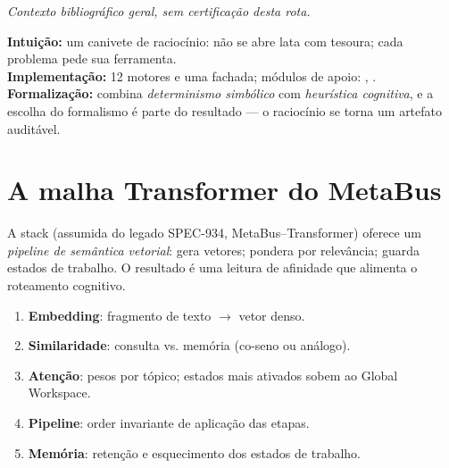 \noindent\textit{Contexto bibliográfico geral, sem certificação desta rota.} 


\begin{niveis}
\textbf{Intuição:} um canivete de raciocínio: não se abre lata com tesoura; cada
problema pede sua ferramenta.\\
\textbf{Implementação:} 12 motores e uma fachada; módulos de apoio:
,
.\\
\textbf{Formalização:} combina \emph{determinismo simbólico} com \emph{heurística
cognitiva}, e a escolha do formalismo é parte do resultado — o raciocínio se
torna um artefato auditável.
\end{niveis}

\clearpage
\section{A malha Transformer do MetaBus}


\begin{descricao}
A stack  (assumida do legado SPEC-934, MetaBus--Transformer)
oferece um \emph{pipeline de semântica vetorial}:  gera vetores;
 pondera por
relevância;  guarda estados
de trabalho. O resultado é uma leitura de afinidade que alimenta o roteamento
cognitivo.
\end{descricao}

\begin{metodo}
\begin{enumerate}[leftmargin=1.4em,itemsep=1pt]
  \item \textbf{Embedding}: fragmento de texto $\to$ vetor denso.
  \item \textbf{Similaridade}: consulta vs. memória (co-seno ou análogo).
  \item \textbf{Atenção}: pesos por tópico; estados mais ativados sobem ao
        Global Workspace.
  \item \textbf{Pipeline}: order invariante de aplicação das etapas.
  \item \textbf{Memória}: retenção e esquecimento dos estados de trabalho.
\end{enumerate}
\end{metodo}

